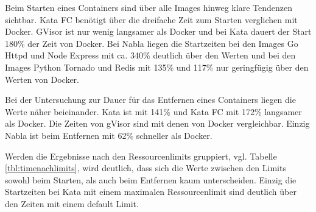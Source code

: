 Beim Starten eines Containers sind über alle Images hinweg klare Tendenzen sichtbar. Kata FC benötigt über die dreifache Zeit zum Starten verglichen mit Docker. GVisor ist nur wenig langsamer als Docker und bei Kata dauert der Start 180\% der Zeit von Docker. Bei Nabla liegen die Startzeiten bei den Images Go Httpd und Node Express mit ca. 340\% deutlich über den Werten und bei den Images Python Tornado und Redis mit 135\% und 117\% nur geringfügig über den Werten von Docker.

Bei der Untersuchung zur Dauer für das Entfernen eines Containers liegen die Werte näher beieinander. Kata ist mit 141\% und Kata FC mit 172\% langsamer als Docker. Die Zeiten von gVisor sind mit denen von Docker vergleichbar. Einzig Nabla ist beim Entfernen mit 62\% schneller als Docker.

Werden die Ergebnisse nach den Ressourcenlimits gruppiert, vgl. Tabelle \ref{tbl:timenachlimits}, wird deutlich, dass sich die Werte zwischen den Limits sowohl beim Starten, als auch beim Entfernen kaum unterscheiden. Einzig die Startzeiten bei Kata mit einem maximalen Ressourcenlimit sind deutlich über den Zeiten mit einem default Limit. 

